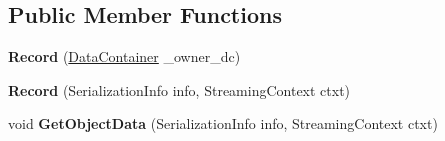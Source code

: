 \subsection*{Public Member Functions}
\begin{DoxyCompactItemize}
\item 
\hypertarget{class_dwarf_d_b_1_1_data_structures_1_1_record_ac6bae5700b3a08e9903a5c592d810de0}{
{\bfseries Record} (\hyperlink{class_dwarf_d_b_1_1_data_structures_1_1_data_container}{DataContainer} \_\-owner\_\-dc)}
\label{class_dwarf_d_b_1_1_data_structures_1_1_record_ac6bae5700b3a08e9903a5c592d810de0}

\item 
\hypertarget{class_dwarf_d_b_1_1_data_structures_1_1_record_a184d66ff6a8abfd88fc08aec61635295}{
{\bfseries Record} (SerializationInfo info, StreamingContext ctxt)}
\label{class_dwarf_d_b_1_1_data_structures_1_1_record_a184d66ff6a8abfd88fc08aec61635295}

\item 
\hypertarget{class_dwarf_d_b_1_1_data_structures_1_1_record_ac10ee5af7dc2c00f831de89d0ac6592e}{
void {\bfseries GetObjectData} (SerializationInfo info, StreamingContext ctxt)}
\label{class_dwarf_d_b_1_1_data_structures_1_1_record_ac10ee5af7dc2c00f831de89d0ac6592e}


\end{DoxyCompactItemize}
